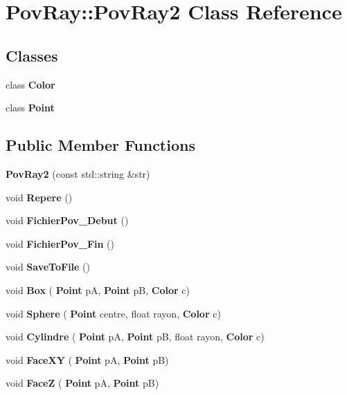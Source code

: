\section{Pov\+Ray\+:\+:Pov\+Ray2 Class Reference}
\label{class_pov_ray_1_1_pov_ray2}
\subsection*{Classes}
\begin{DoxyCompactItemize}
\item 
class \textbf{ Color}
\item 
class \textbf{ Point}
\end{DoxyCompactItemize}
\subsection*{Public Member Functions}
\begin{DoxyCompactItemize}
\item 
\mbox{\label{class_pov_ray_1_1_pov_ray2_a406830b8660f8b663638e088df68f667}} 
{\bfseries Pov\+Ray2} (const std\+::string \&str)
\item 
\mbox{\label{class_pov_ray_1_1_pov_ray2_a6252e0fcb0284511239b958d6055b753}} 
void {\bfseries Repere} ()
\item 
\mbox{\label{class_pov_ray_1_1_pov_ray2_a3aca29106ba7b7ea8e10319dc1daff12}} 
void {\bfseries Fichier\+Pov\+\_\+\+Debut} ()
\item 
\mbox{\label{class_pov_ray_1_1_pov_ray2_a86dd8fc3a11b14636660e0e79285bf68}} 
void {\bfseries Fichier\+Pov\+\_\+\+Fin} ()
\item 
\mbox{\label{class_pov_ray_1_1_pov_ray2_ae4d0d4637b7c82467f83106251dc5590}} 
void {\bfseries Save\+To\+File} ()
\item 
\mbox{\label{class_pov_ray_1_1_pov_ray2_a37d75622523e020b273c38a4cfebf0cd}} 
void {\bfseries Box} (\textbf{ Point} pA, \textbf{ Point} pB, \textbf{ Color} c)
\item 
\mbox{\label{class_pov_ray_1_1_pov_ray2_a953d98ac33a6451d6cf8162d9c107088}} 
void {\bfseries Sphere} (\textbf{ Point} centre, float rayon, \textbf{ Color} c)
\item 
\mbox{\label{class_pov_ray_1_1_pov_ray2_ac9831468bc6d2d197682845c7ee6c7f7}} 
void {\bfseries Cylindre} (\textbf{ Point} pA, \textbf{ Point} pB, float rayon, \textbf{ Color} c)
\item 
\mbox{\label{class_pov_ray_1_1_pov_ray2_a1f61a4895abc1fd884e2fdf9fbcff3c2}} 
void {\bfseries Face\+XY} (\textbf{ Point} pA, \textbf{ Point} pB)
\item 
\mbox{\label{class_pov_ray_1_1_pov_ray2_a9297aff14816d16ef1fa58e392280779}} 
void {\bfseries FaceZ} (\textbf{ Point} pA, \textbf{ Point} pB)
\end{DoxyCompactItemize}
